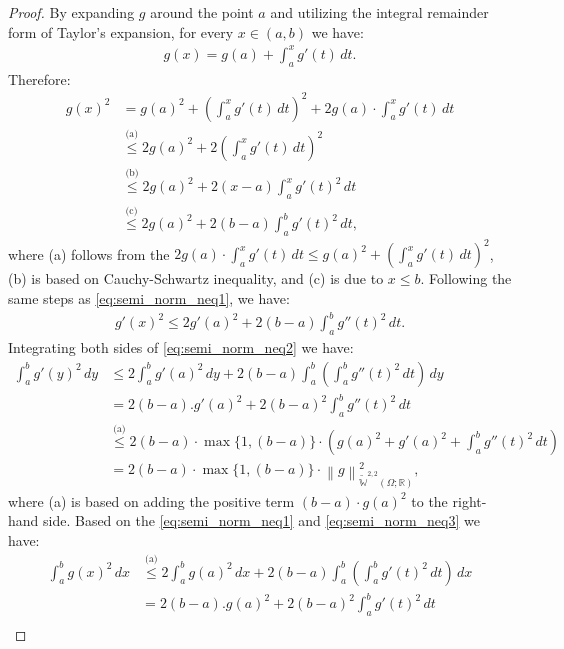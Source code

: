 \documentclass[10pt,a4paper]{amsart}
\newcommand{\lec}[2]{\stackrel{\text{#1}}{#2}}
\newcommand{\norm}[1]{\left\lVert#1\right\rVert}
\newcommand{\sobeq}[2]{\widetilde{\mathbb{W}}^{#1,#2}\left(\Omega; \mathbb{R}\right)}
\begin{document}
\begin{proof}
    By expanding $g$ around the point $a$ and utilizing the integral remainder form of Taylor's expansion, for every $x \in (a,b)$ we have:
    \begin{align}
        g(x) = g(a) + \int_a^x g'(t)\,dt.
    \end{align}
    Therefore: \begin{align}\label{eq:semi_norm_neq1}
        g(x)^2 &= g(a)^2 + \left(\int_a^x g'(t)\,dt \right)^2 + 2g(a)\cdot\int_a^x g'(t)\,dt \nonumber \\ 
        &\lec{(a)}{\leqslant} 2g(a)^2 + 2\left(\int_a^x g'(t)\,dt \right)^2 \nonumber \\ 
        &\lec{(b)}{\leqslant} 2g(a)^2 + 2(x-a)\int_a^x g'(t)^2\,dt \nonumber \\  
        &\lec{(c)}{\leqslant}  2g(a)^2 + 2(b-a)\int_a^b g'(t)^2\,dt,
    \end{align}
    where (a) follows from the $ 2g(a)\cdot\int_a^x g'(t)\,dt \leqslant g(a)^2 + \left(\int_a^x g'(t)\,dt \right)^2$, (b) is based on Cauchy-Schwartz inequality, and (c) is due to $x \leqslant b$. Following the same steps as \eqref{eq:semi_norm_neq1}, we have:
\begin{align}\label{eq:semi_norm_neq2}
        g'(x)^2 \leqslant 2g'(a)^2 + 2(b-a)\int_a^b g''(t)^2\,dt.
    \end{align}
    Integrating both sides of \eqref{eq:semi_norm_neq2} we have:
\begin{align}\label{eq:semi_norm_neq3}
        \int_a^b g'(y)^2\,dy &\leqslant 2\int_a^b g'(a)^2\,dy + 2(b-a)\int_a^b \left(\int_a^b g''(t)^2\,dt\right) \,dy \nonumber \\ 
        &= 2(b-a).g'(a)^2 + 2(b-a)^2 \int_a^b g''(t)^2\,dt \nonumber \\
        &\lec{(a)}{\leqslant} 2(b-a)\cdot \max\{1, (b-a)\} \cdot \left(g(a)^2 + g'(a)^2 + \int_a^b g''(t)^2\,dt \right)\nonumber \\
        &= 2(b-a)\cdot\max\{1, (b-a)\}\cdot\norm{g}^2_{\sobeq{2}{2}},
    \end{align}
    where (a) is based on adding the positive term $(b-a)\cdot g(a)^2$ to the right-hand side. Based on the \eqref{eq:semi_norm_neq1} and \eqref{eq:semi_norm_neq3} we have:
\begin{align}\label{eq:semi_norm_neq4}
        \int_a^b g(x)^2\,dx &\lec{(a)}{\leqslant} 2\int_a^b g(a)^2\,dx + 2(b-a)\int_a^b \left(\int_a^b g'(t)^2\,dt\right)\,dx \nonumber \\ 
        &= 2(b-a).g(a)^2 + 2(b-a)^2 \int_a^b g'(t)^2\,dt \nonumber \\ 

\end{align}
\end{proof}
\end{document}
